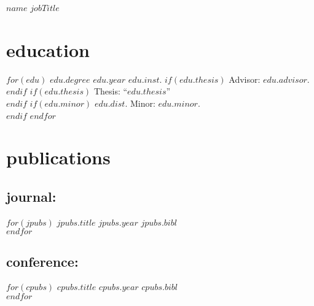 \documentclass[]{friggeri-cv}
\begin{document}
\header
  {$name$}
  {$jobTitle$}






\section{education}
\begin{entrylist}
$for(edu)$
  \entrypub
  {$edu.degree$}
  {$edu.year$}
  {$edu.inst$.}
  $if(edu.thesis)$
    {Advisor: $edu.advisor$}.\\
  $endif$
  $if(edu.thesis)$
    {Thesis: ``$edu.thesis$''}\\
  $endif$
  $if(edu.minor)$
    {$edu.dist$. Minor: $edu.minor$}.\\
  $endif$
$endfor$
\end{entrylist}



\section{publications}

\subsection{journal:}
\begin{entrylist}
$for(jpubs)$
  \entrypub
  {$jpubs.title$}
  {$jpubs.year$}
  {$jpubs.bibl$}\\
$endfor$
\end{entrylist}

\subsection{conference:}
\begin{entrylist}
$for(cpubs)$
  \entrypub
  {$cpubs.title$}
  {$cpubs.year$}
  {$cpubs.bibl$}\\
$endfor$
\end{entrylist}
\end{document}
